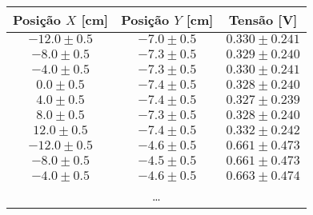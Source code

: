 \begin{tabular}{ccc}
\toprule
Posição $X$ [\si{\cm}] & Posição $Y$ [\si{\cm}] & Tensão [\si{\volt}] \\
\midrule
       $-12.0 \pm 0.5$ &         $-7.0 \pm 0.5$ &   $0.330 \pm 0.241$ \\
        $-8.0 \pm 0.5$ &         $-7.3 \pm 0.5$ &   $0.329 \pm 0.240$ \\
        $-4.0 \pm 0.5$ &         $-7.3 \pm 0.5$ &   $0.330 \pm 0.241$ \\
         $0.0 \pm 0.5$ &         $-7.4 \pm 0.5$ &   $0.328 \pm 0.240$ \\
         $4.0 \pm 0.5$ &         $-7.4 \pm 0.5$ &   $0.327 \pm 0.239$ \\
         $8.0 \pm 0.5$ &         $-7.3 \pm 0.5$ &   $0.328 \pm 0.240$ \\
        $12.0 \pm 0.5$ &         $-7.4 \pm 0.5$ &   $0.332 \pm 0.242$ \\
       $-12.0 \pm 0.5$ &         $-4.6 \pm 0.5$ &   $0.661 \pm 0.473$ \\
        $-8.0 \pm 0.5$ &         $-4.5 \pm 0.5$ &   $0.661 \pm 0.473$ \\
        $-4.0 \pm 0.5$ &         $-4.6 \pm 0.5$ &   $0.663 \pm 0.474$ \\
\multicolumn{3}{c}{\dots} \\
\bottomrule
\end{tabular}
